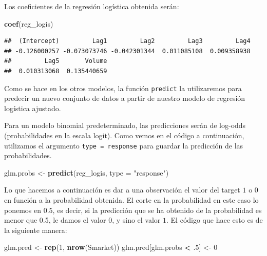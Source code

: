 \documentclass[]{book}
\newenvironment{Shaded}{\begin{snugshade}}{\end{snugshade}}
\newcommand{\DataTypeTok}[1]{\textcolor[rgb]{0.13,0.29,0.53}{#1}}
\newcommand{\DecValTok}[1]{\textcolor[rgb]{0.00,0.00,0.81}{#1}}
\newcommand{\FloatTok}[1]{\textcolor[rgb]{0.00,0.00,0.81}{#1}}
\newcommand{\KeywordTok}[1]{\textcolor[rgb]{0.13,0.29,0.53}{\textbf{#1}}}
\newcommand{\NormalTok}[1]{#1}
\newcommand{\OperatorTok}[1]{\textcolor[rgb]{0.81,0.36,0.00}{\textbf{#1}}}
\newcommand{\StringTok}[1]{\textcolor[rgb]{0.31,0.60,0.02}{#1}}
\begin{document}
Los coeficientes de la regresión logística obtenida serán:

\begin{Shaded}
\begin{Highlighting}[]
\KeywordTok{coef}\NormalTok{(reg_logis)}
\end{Highlighting}
\end{Shaded}

\begin{verbatim}
##  (Intercept)         Lag1         Lag2         Lag3         Lag4 
## -0.126000257 -0.073073746 -0.042301344  0.011085108  0.009358938 
##         Lag5       Volume 
##  0.010313068  0.135440659
\end{verbatim}

Como se hace en los otros modelos, la función \texttt{predict} la utilizaremos para predecir un nuevo conjunto de datos a partir de nuestro modelo de regresión logística ajustado.

Para un modelo binomial predeterminado, las predicciones serán de log-odds (probabilidades en la escala logit). Como vemos en el código a continuación, utilizamos el argumento \texttt{type\ =\ response} para guardar la predicción de las probabilidades.

\begin{Shaded}
\begin{Highlighting}[]
\NormalTok{glm.probs <-}\StringTok{ }\KeywordTok{predict}\NormalTok{(reg_logis,}
                     \DataTypeTok{type =}  \StringTok{"response"}\NormalTok{)}
\end{Highlighting}
\end{Shaded}

Lo que hacemos a continuación es dar a una observación el valor del target \(1\) o \(0\) en función a la probabilidad obtenida. El corte en la probabilidad en este caso lo ponemos en \(0.5\), es decir, si la predicción que se ha obtenido de la probabilidad es menor que 0.5, le damos el valor \(0\), y sino el valor \(1\). El código que hace esto es de la siguiente manera:

\begin{Shaded}
\begin{Highlighting}[]
\NormalTok{glm.pred <-}\StringTok{ }\KeywordTok{rep}\NormalTok{(}\DecValTok{1}\NormalTok{, }\KeywordTok{nrow}\NormalTok{(Smarket))}
\NormalTok{glm.pred[glm.probs }\OperatorTok{<}\StringTok{ }\FloatTok{.5}\NormalTok{] <-}\StringTok{ }\DecValTok{0}
\end{Highlighting}
\end{Shaded}
\end{document}
